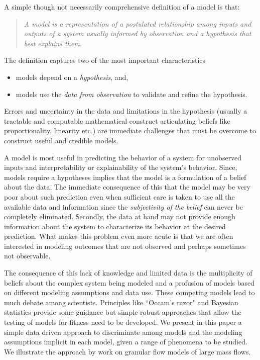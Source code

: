 \documentclass{article}
\begin{document}
A simple though not necessarily comprehensive definition of a model is that: \begin{quote} {\it A model is a representation of a postulated relationship among inputs and outputs of a system usually informed by observation and a hypothesis that  best explains them.} \end{quote} The definition  captures two of the most important characteristics
\begin{itemize}
\item models depend on a {\it hypothesis}, and,
\item models use the {\it data from observation} to validate and refine the hypothesis.
\end{itemize}
Errors and uncertainty in the data and limitations in the hypothesis (usually a tractable and computable mathematical construct articulating beliefs like proportionality, linearity etc.) are immediate challenges that must be overcome to construct useful and credible models.

A model is most useful in predicting the behavior of a system for unobserved inputs and interpretability or explainability of the system's behavior. Since, models require a hypotheses implies that the model is a formulation of a belief about the data. The immediate consequence of this that the model may be  very poor about such prediction even when sufficient care is taken to use all the available data and information since the {\it subjectivity of the belief} can never be completely eliminated. Secondly, the data at hand may not provide enough information about the system to characterize its behavior at the desired prediction. What makes this problem even more acute is that we are often interested in modeling outcomes that are not observed and perhaps sometimes not observable.

The consequence of this lack of knowledge and limited data is the multiplicity of beliefs about the complex system being modeled and a profusion of models based on different modeling assumptions and data use. These competing models lead to much debate among scientists. Principles like ``Occam's razor" and Bayesian statistics \cite{Farrell2015} provide some guidance but simple robust approaches that allow the testing of models for fitness need to be developed. We present in this paper a simple data driven approach to discriminate among models and the modeling assumptions implicit in each model, given a range of phenomena to be studied. We  illustrate  the approach by work on granular flow models of large mass flows.
\end{document}
